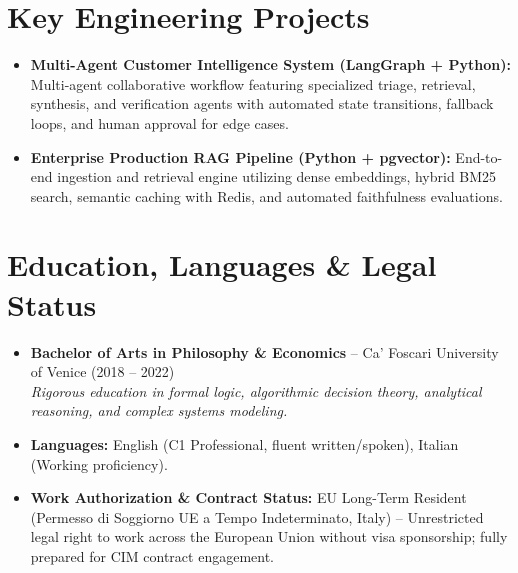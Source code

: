 \documentclass[a4paper,10pt]{article}
\begin{document}
\section{Key Engineering Projects}
\begin{itemize}
  \item \textbf{Multi-Agent Customer Intelligence System (LangGraph + Python):} Multi-agent collaborative workflow featuring specialized triage, retrieval, synthesis, and verification agents with automated state transitions, fallback loops, and human approval for edge cases.
  \item \textbf{Enterprise Production RAG Pipeline (Python + pgvector):} End-to-end ingestion and retrieval engine utilizing dense embeddings, hybrid BM25 search, semantic caching with Redis, and automated faithfulness evaluations.
\end{itemize}

\section{Education, Languages \& Legal Status}
\begin{itemize}
  \item \textbf{Bachelor of Arts in Philosophy \& Economics} -- Ca' Foscari University of Venice (2018 -- 2022) \\
  \textit{Rigorous education in formal logic, algorithmic decision theory, analytical reasoning, and complex systems modeling.}
  \item \textbf{Languages:} English (C1 Professional, fluent written/spoken), Italian (Working proficiency).
  \item \textbf{Work Authorization \& Contract Status:} EU Long-Term Resident (Permesso di Soggiorno UE a Tempo Indeterminato, Italy) -- Unrestricted legal right to work across the European Union without visa sponsorship; fully prepared for CIM contract engagement.
\end{itemize}
\end{document}
